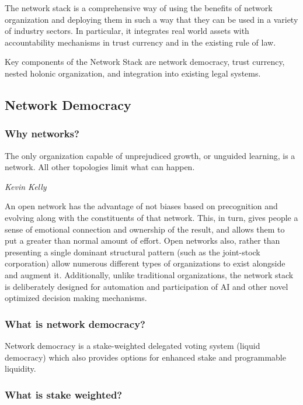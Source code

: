 \documentclass{article}
\begin{document}
The network stack is a comprehensive way of using the benefits of network organization and deploying them in such a way that they can be used in a variety of industry sectors. In particular, it integrates real world assets with accountability mechanisms in trust currency and in the existing rule of law.

Key components of the Network Stack are network democracy, trust currency, nested holonic organization, and integration into existing legal systems.

\subsection {Network Democracy}

\subsubsection {Why networks?}

\epigraph{The only organization capable of unprejudiced growth, or unguided learning, is a network. All other topologies limit what can happen.}{\textit{Kevin Kelly}\cite{outofcontrol}}

An open network has the advantage of not biases based on precognition and evolving along with the constituents of that network. This, in turn, gives people a sense of emotional connection and ownership of the result, and allows them to put a greater than normal amount of effort. Open networks also, rather than presenting a single dominant structural pattern (such as the joint-stock corporation) allow numerous different types of organizations to exist alongside and augment it.  Additionally, unlike traditional organizations, the network stack is deliberately designed for automation and participation of AI and other novel optimized decision making mechanisms.

\subsubsection {What is network democracy?}

Network democracy is a stake-weighted delegated voting system (liquid democracy) which also provides options for enhanced stake and programmable liquidity.

\subsubsection {What is stake weighted?}
\end{document}
